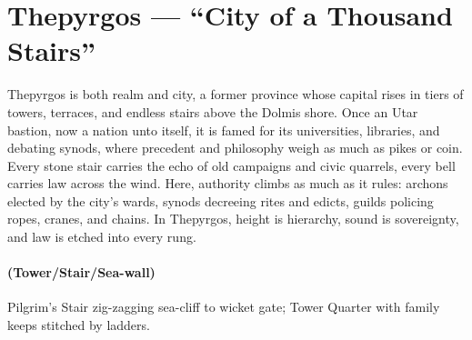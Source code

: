 \section{Thepyrgos --- ``City of a Thousand Stairs''}
\label{chap:thepyrgos}

\begin{tcolorbox}[colback=black!3,colframe=black!40!white,title={Theme \& Atmosphere}]
Thepyrgos is both realm and city, a former province whose capital rises in tiers of towers, terraces, and endless stairs above the Dolmis shore. Once an Utar bastion, now a nation unto itself, it is famed for its universities, libraries, and debating synods, where precedent and philosophy weigh as much as pikes or coin. Every stone stair carries the echo of old campaigns and civic quarrels, every bell carries law across the wind. Here, authority climbs as much as it rules: archons elected by the city's wards, synods decreeing rites and edicts, guilds policing ropes, cranes, and chains. In Thepyrgos, height is hierarchy, sound is sovereignty, and law is etched into every rung.
\end{tcolorbox}

\paragraph*{(Tower/Stair/Sea-wall)} Pilgrim's Stair zig-zagging sea-cliff to wicket gate; Tower Quarter with family keeps stitched by ladders.

